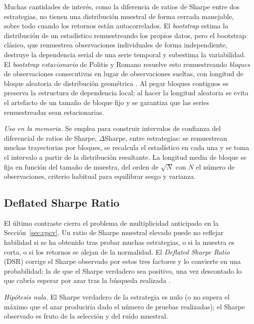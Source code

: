 Muchas cantidades de interés, como la diferencia de ratios de Sharpe entre dos estrategias, no tienen una distribución muestral de forma cerrada manejable, sobre todo cuando los retornos están autocorrelados. El \emph{bootstrap} estima la distribución de un estadístico remuestreando los propios datos, pero el bootstrap clásico, que remuestrea observaciones individuales de forma independiente, destruye la dependencia serial de una serie temporal y subestima la variabilidad. El \emph{bootstrap estacionario} de Politis y Romano resuelve esto remuestreando \emph{bloques} de observaciones consecutivas en lugar de observaciones sueltas, con longitud de bloque aleatoria de distribución geométrica \cite{politis1994}. Al pegar bloques contiguos se preserva la estructura de dependencia local; al hacer la longitud aleatoria se evita el artefacto de un tamaño de bloque fijo y se garantiza que las series remuestreadas sean estacionarias.

\emph{Uso en la memoria.} Se emplea para construir intervalos de confianza del diferencial de ratios de Sharpe, $\Delta$Sharpe, entre estrategias: se remuestrean muchas trayectorias por bloques, se recalcula el estadístico en cada una y se toma el intervalo a partir de la distribución resultante. La longitud media de bloque se fija en función del tamaño de muestra, del orden de $\sqrt{N}$ con $N$ el número de observaciones, criterio habitual para equilibrar sesgo y varianza.

\subsection{Deflated Sharpe Ratio}
\label{sec:tests-dsr}

El último contraste cierra el problema de multiplicidad anticipado en la Sección~\ref{sec:cpcv}. Un ratio de Sharpe muestral elevado puede no reflejar habilidad si se ha obtenido tras probar muchas estrategias, o si la muestra es corta, o si los retornos se alejan de la normalidad. El \emph{Deflated Sharpe Ratio} (DSR) corrige el Sharpe observado por estos tres factores y lo convierte en una probabilidad: la de que el Sharpe verdadero sea positivo, una vez descontado lo que cabría esperar por azar tras la búsqueda realizada \cite{bailey2014}.

\emph{Hipótesis nula.} El Sharpe verdadero de la estrategia es nulo (o no supera el máximo que el azar produciría dado el número de pruebas realizadas); el Sharpe observado es fruto de la selección y del ruido muestral.

